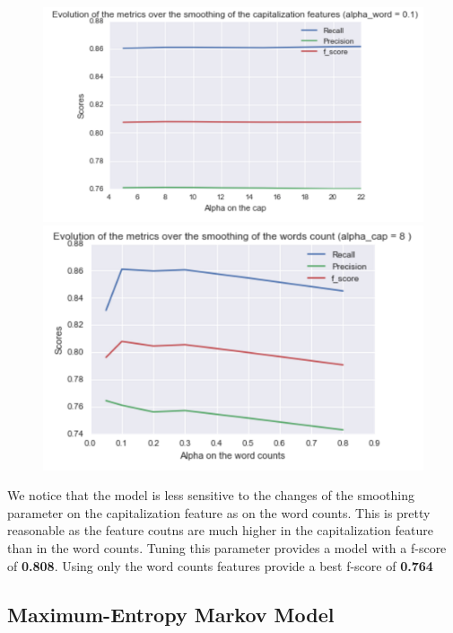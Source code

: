 \documentclass[11pt]{article}
\begin{document}
\begin{figure}[H]
\centering
\begin{minipage}{.5\textwidth}
  \centering
  \includegraphics[width=1\linewidth]{cap_plot}
\end{minipage}%
\begin{minipage}{.5\textwidth}
  \centering
  \includegraphics[width=1\linewidth]{wc_plot}
\end{minipage}
\end{figure}

We notice that the model is less sensitive to the changes of the smoothing parameter on the capitalization feature as on the word counts. This is pretty reasonable as the feature coutns are much higher in the capitalization feature than in the word counts. Tuning this parameter provides a model with a f-score of \textbf{0.808}. Using only the word counts features provide a best f-score of \textbf{0.764}


\subsection{Maximum-Entropy Markov Model}
\end{document}
